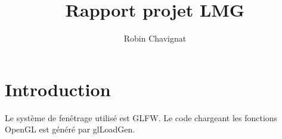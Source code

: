 \documentclass[fr]{article}
\begin{document}
\author{Robin Chavignat}
\title{Rapport projet LMG}
\maketitle

\section{Introduction}
Le système de fenêtrage utilisé est GLFW. Le code chargeant les fonctions OpenGL est généré par glLoadGen.
\end{document}

